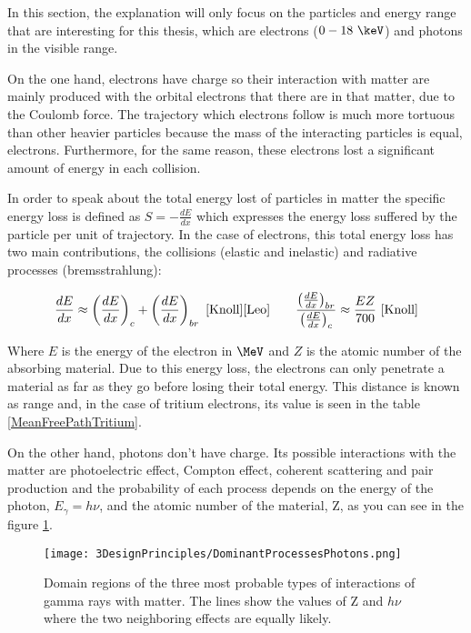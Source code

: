In this section, the explanation will only focus on the particles and energy range that are interesting for this thesis, which are electrons ($0-18~\keV$) and photons in the visible range.

On the one hand, electrons have charge so their interaction with matter are mainly produced with the orbital electrons that there are in that matter, due to the Coulomb force. The trajectory which electrons follow is much more tortuous than other heavier particles because the mass of the interacting particles is equal, electrons. Furthermore, for the same reason, these electrons lost a significant amount of energy in each collision.

In order to speak about the total energy lost of particles in matter the specific energy loss is defined as $S=-\frac{dE}{dx}$ which expresses the energy loss suffered by the particle per unit of trajectory. In the case of electrons, this total energy loss has two main contributions, the collisions (elastic and inelastic) and radiative processes (bremsstrahlung):

$$\frac{dE}{dx} \approx \left(\frac{dE}{dx}\right)_{c} + \left(\frac{dE}{dx}\right)_{br} ~\cite{Knoll} \cite{Leo} \qquad  \frac{\left(\frac{dE}{dx}\right)_{br}}{\left(\frac{dE}{dx}\right)_{c}} \approx \frac{EZ}{700} ~\cite{Knoll}$$

Where $E$ is the energy of the electron in $\MeV$ and $Z$ is the atomic number of the absorbing material. Due to this energy loss, the electrons can only penetrate a material as far as they go before losing their total energy. This distance is known as range and, in the case of tritium electrons, its value is seen in the table \ref{MeanFreePathTritium}.

On the other hand, photons don't have charge. Its possible interactions with the matter are photoelectric effect, Compton effect, coherent scattering and pair production and the probability of each process depends on the energy of the photon, $E_\gamma = h\nu$, and the atomic number of the material, Z, as you can see in the figure \ref{ProcessesPhotons}.

\begin{figure}[htbp]
\centering
\texttt{[image: 3DesignPrinciples/DominantProcessesPhotons.png]}
\caption{Domain regions of the three most probable types of interactions of gamma rays with matter. The lines show the values of Z and $h\nu$ where the two neighboring effects are equally likely.\label{ProcessesPhotons}~\cite{Knoll}~\cite{Leo}}
\end{figure}

